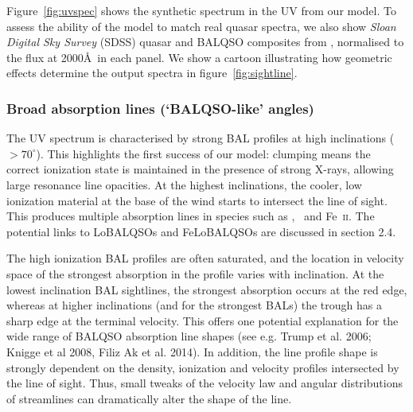 \documentclass[useAMS,usenatbib]{mn2e_x}
\begin{document}

Figure~\ref{fig:uvspec} shows the synthetic spectrum in the UV from our model. 
To assess the ability of the model to match real 
quasar spectra, we also show {\sl Sloan Digital Sky Survey} (SDSS) quasar and BALQSO 
composites from \cite{reichard2003}, normalised to the flux at 2000\AA\ in each panel. 
We show a cartoon illustrating how geometric effects determine
the output spectra in figure~\ref{fig:sightline}.  

\subsubsection{Broad absorption lines (`BALQSO-like' angles)}

The UV spectrum is characterised by strong BAL 
profiles at high inclinations ($> 70^\circ$). 
This highlights the first success of our model: 
clumping means the correct ionization state 
is maintained in the presence of strong X-rays, 
allowing large resonance line opacities. 
At the highest inclinations, the 
cooler, low ionization material at the base of the wind
starts to intersect the line of sight. This produces 
multiple absorption lines in species such as \mg,
\al\ and Fe~\textsc{ii}. The potential links to LoBALQSOs and 
FeLoBALQSOs are discussed in section 2.4.

The high ionization BAL profiles are often saturated, and the location in velocity space
of the strongest absorption in the profile varies with inclination.
At the lowest inclination BAL sightlines, the strongest absorption occurs at the red edge,
whereas at higher inclinations (and for the strongest BALs)
the trough has a sharp edge at the terminal velocity.
This offers one potential explanation for the wide range of BALQSO absorption
line shapes (see e.g. Trump et al. 2006; Knigge et al 2008, Filiz Ak et al. 2014).
In addition, the line profile shape is strongly dependent 
on the density, ionization and velocity 
profiles intersected by the line of sight. Thus, small tweaks of the velocity
law and angular distributions of streamlines can dramatically alter
the shape of the line.
\end{document}
